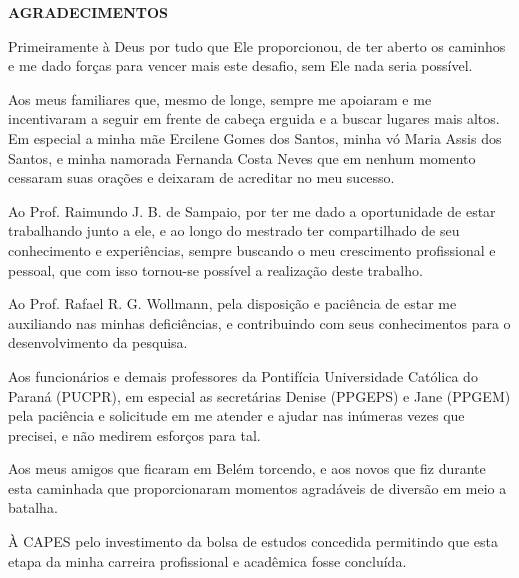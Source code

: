 \begin{center}
    \textbf{AGRADECIMENTOS}
\end{center}

Primeiramente à Deus por tudo que Ele proporcionou, de ter aberto os caminhos e me dado forças para vencer mais este desafio, sem Ele nada seria possível.

Aos meus familiares que, mesmo de longe, sempre me apoiaram e me incentivaram a seguir em frente de cabeça erguida e a buscar lugares mais altos. Em especial a minha mãe Ercilene Gomes dos Santos, minha vó Maria Assis dos Santos, e minha namorada Fernanda Costa Neves que em nenhum momento cessaram suas orações e deixaram de acreditar no meu sucesso.

Ao Prof. Raimundo J. B. de Sampaio, por ter me dado a oportunidade de estar trabalhando junto a ele, e ao longo do mestrado ter compartilhado de seu conhecimento e experiências, sempre buscando o meu crescimento profissional e pessoal, que com isso tornou-se possível a realização deste trabalho.

Ao Prof. Rafael R. G. Wollmann, pela disposição e paciência de estar me auxiliando nas minhas deficiências, e contribuindo com seus conhecimentos para o desenvolvimento da pesquisa.

Aos funcionários e demais professores da Pontifícia Universidade Católica do Paraná (PUCPR), em especial as secretárias Denise (PPGEPS) e Jane (PPGEM) pela paciência e solicitude em me atender e ajudar nas inúmeras vezes que precisei, e não medirem esforços para tal.

Aos meus amigos que ficaram em Belém torcendo, e aos novos que fiz durante esta caminhada que proporcionaram momentos agradáveis de diversão em meio a batalha. 

À CAPES pelo investimento da bolsa de estudos concedida permitindo que esta etapa da minha carreira profissional e acadêmica fosse concluída.